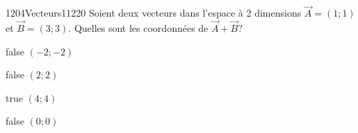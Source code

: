         	\begin{question}{1204}{Vecteurs}{1}{1220}
            	Soient deux vecteurs dans l'espace à 2 dimensions $\vec{A}=(1;1)$ et $\vec{B}=(3;3)$. Quelles sont les coordonnées de $\vec{A}+\vec{B}$?
            \end{question}
            \begin{reponses}
            	\item[false] $(-2;-2)$
            	\item[false] $(2;2)$
                \item[true] $(4;4)$
                \item[false] $(0;0)$
            \end{reponses}
